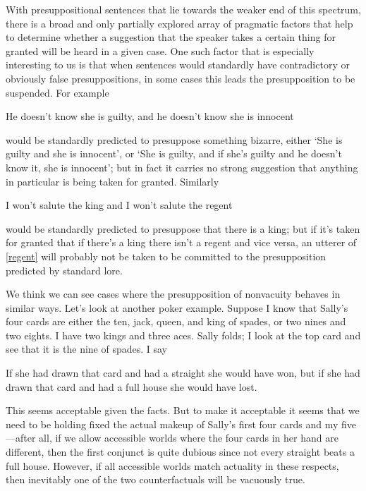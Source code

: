 \documentclass[If.tex]{subfiles}
\begin{document}
With presuppositional sentences that lie towards the weaker end of this spectrum, there is a broad and only partially explored array of pragmatic factors that help to determine whether a suggestion that the speaker takes a certain thing for granted will be heard in a given case. One such factor that is especially interesting to us is that when sentences would standardly have contradictory or obviously false presuppositions, in some cases this leads the presupposition to be suspended. For example
\begin{prop}
	\nitem 
	He doesn't know she is guilty, and he doesn't know she is innocent
\end{prop}
would be standardly predicted to presuppose something bizarre, either ‘She is guilty and she is innocent’, or ‘She is guilty, and if she's guilty and he doesn't know it, she is innocent’; but in fact it carries no strong suggestion that anything in particular is being taken for granted. Similarly
\begin{prop}
	\nitem \label{regent}
	I won't salute the king and I won't salute the regent
\end{prop}
would be standardly predicted to presuppose that there is a king; but if it's taken for granted that if there's a king there isn't a regent and vice versa, an utterer of \ref{regent} will probably not be taken to be committed to the presupposition predicted by standard lore.

We think we can see cases where the presupposition of nonvacuity behaves in similar ways. Let's look at another poker example. Suppose I know that Sally's four cards are either the ten, jack, queen, and king of spades, or two nines and two eights. I have two kings and three aces. Sally folds; I look at the top card and see that it is the nine of spades. I say
\begin{prop}
	\nitem \label{cards}
		If she had drawn that card and had a straight she would have won, but if she had drawn that card and had a full house she would have lost.
\end{prop}
This seems acceptable given the facts. But to make it acceptable it seems that we need to be holding fixed the actual makeup of Sally's first four cards and my five---after all, if we allow accessible worlds where the four cards in her hand are different, then the first conjunct is quite dubious since not every straight beats a full house. However, if all accessible worlds match actuality in these respects, then inevitably one of the two counterfactuals will be vacuously true.
\end{document}
